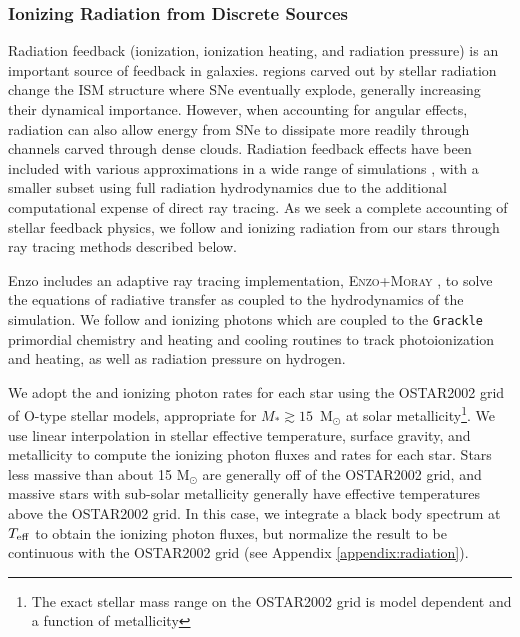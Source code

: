 \documentclass[twocolumn]{aastex61}
\begin{document}
\subsubsection{Ionizing Radiation from Discrete Sources}
\label{sec:ionizing radiation}
Radiation feedback (ionization, ionization heating, and radiation pressure) is an important source of feedback in galaxies.  regions carved out by stellar radiation change the ISM structure where SNe eventually explode, generally increasing their dynamical importance. However, when accounting for angular effects, radiation can also allow energy from SNe to dissipate more readily through channels carved through dense clouds. Radiation feedback effects have been included with various approximations in a wide range of simulations \citep[e.g.][]{OppenheimerDave2006, Krumholz2007, HopkinsQuataertMurray2012, Agertz2013, Renaud2013, Stinson2013, Roskar2014, Ceverino2014, FIRE, AgertzKravtsov2015, Forbes2016, Hu2016, Hu2017, FIRE2}, with a smaller subset using full radiation hydrodynamics \citep{WiseAbel2012,Wise2012a,Wise2014,Kim2013a, Kim2013b,Pawlik2013,Rosdahl2015,Aubert2015,Ocvirk2016,BaczynskiGloverKlessen2015,Pawlik2017} due to the additional computational expense of direct ray tracing. As we seek a complete accounting of stellar feedback physics, we follow  and  ionizing radiation from our stars through ray tracing methods described below. 

Enzo includes an adaptive ray tracing implementation, \textsc{Enzo+Moray} \citep{WiseAbel2011}, to solve the equations of radiative transfer as coupled to the hydrodynamics of the simulation. We follow  and  ionizing photons which are coupled to the \texttt{Grackle} primordial chemistry and heating and cooling routines to track photoionization and heating, as well as radiation pressure on hydrogen. 

We adopt the  and  ionizing photon rates for each star using the OSTAR2002 \citep{Lanz2003} grid of O-type stellar models, appropriate for $M_{*} \gtrsim 15$~M$_{\odot}$ at solar metallicity\footnote{The exact stellar mass range on the OSTAR2002 grid is model dependent and a function of metallicity}. We use linear interpolation in stellar effective temperature, surface gravity, and metallicity to compute the ionizing photon fluxes and rates for each star. Stars less massive than about 15 M$_{\odot}$ are generally off of the OSTAR2002 grid, and massive stars with sub-solar metallicity generally have effective temperatures above the OSTAR2002 grid. In this case, we integrate a black body spectrum at $T_{\rm eff}$ to obtain the ionizing photon fluxes, but normalize the result to be continuous with the OSTAR2002 grid (see Appendix \ref{appendix:radiation}).
\end{document}
